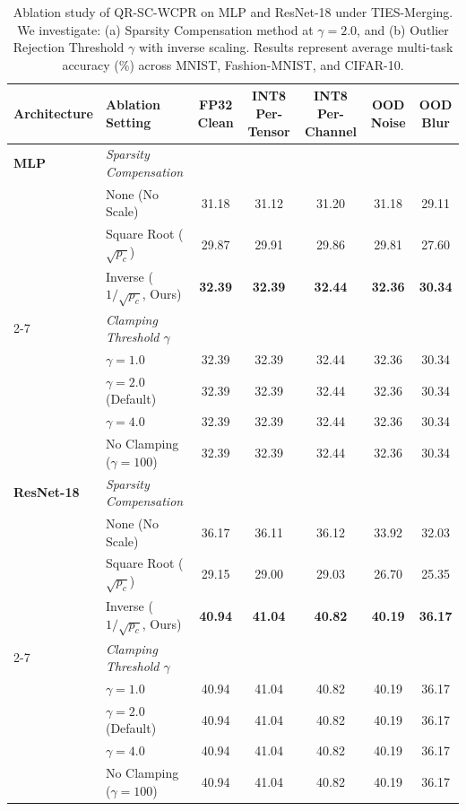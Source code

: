 \documentclass{article}
\theoremstyle{plain}
\theoremstyle{definition}
\theoremstyle{remark}
\begin{document}
\begin{table}[t]
\caption{Ablation study of QR-SC-WCPR on MLP and ResNet-18 under TIES-Merging. We investigate: (a) Sparsity Compensation method at $\gamma=2.0$, and (b) Outlier Rejection Threshold $\gamma$ with inverse scaling. Results represent average multi-task accuracy (\%) across MNIST, Fashion-MNIST, and CIFAR-10.}
\label{tab:ablation_results}
\begin{center}
\scriptsize
\setlength{\tabcolsep}{2.2pt}
\begin{tabular}{llccccc}
\toprule
\textbf{Architecture} & \textbf{Ablation Setting} & \textbf{FP32 Clean} & \textbf{INT8 Per-Tensor} & \textbf{INT8 Per-Channel} & \textbf{OOD Noise} & \textbf{OOD Blur} \\
\midrule
\textbf{MLP} & \textit{Sparsity Compensation} \\
& None (No Scale) & 31.18 & 31.12 & 31.20 & 31.18 & 29.11 \\
& Square Root ($\sqrt{p_c}$) & 29.87 & 29.91 & 29.86 & 29.81 & 27.60 \\
& Inverse ($1/\sqrt{p_c}$, Ours) & \textbf{32.39} & \textbf{32.39} & \textbf{32.44} & \textbf{32.36} & \textbf{30.34} \\
\cmidrule{2-7}
& \textit{Clamping Threshold $\gamma$} \\
& $\gamma = 1.0$ & 32.39 & 32.39 & 32.44 & 32.36 & 30.34 \\
& $\gamma = 2.0$ (Default) & 32.39 & 32.39 & 32.44 & 32.36 & 30.34 \\
& $\gamma = 4.0$ & 32.39 & 32.39 & 32.44 & 32.36 & 30.34 \\
& No Clamping ($\gamma = 100$) & 32.39 & 32.39 & 32.44 & 32.36 & 30.34 \\
\midrule
\textbf{ResNet-18} & \textit{Sparsity Compensation} \\
& None (No Scale) & 36.17 & 36.11 & 36.12 & 33.92 & 32.03 \\
& Square Root ($\sqrt{p_c}$) & 29.15 & 29.00 & 29.03 & 26.70 & 25.35 \\
& Inverse ($1/\sqrt{p_c}$, Ours) & \textbf{40.94} & \textbf{41.04} & \textbf{40.82} & \textbf{40.19} & \textbf{36.17} \\
\cmidrule{2-7}
& \textit{Clamping Threshold $\gamma$} \\
& $\gamma = 1.0$ & 40.94 & 41.04 & 40.82 & 40.19 & 36.17 \\
& $\gamma = 2.0$ (Default) & 40.94 & 41.04 & 40.82 & 40.19 & 36.17 \\
& $\gamma = 4.0$ & 40.94 & 41.04 & 40.82 & 40.19 & 36.17 \\
& No Clamping ($\gamma = 100$) & 40.94 & 41.04 & 40.82 & 40.19 & 36.17 \\
\bottomrule
\end{tabular}
\end{center}
\end{table}
\end{document}
